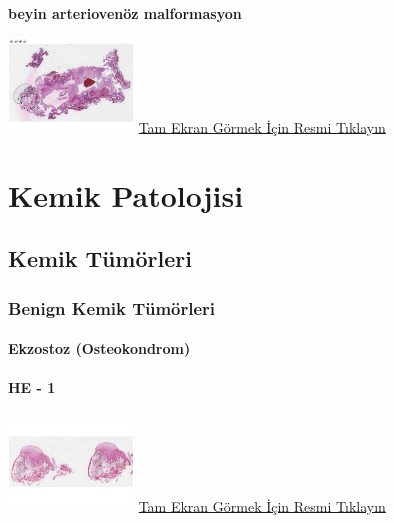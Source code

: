 \documentclass[
  letterpaper,
  DIV=11,
  numbers=noendperiod]{scrreprt}
\begin{document}
\textbf{beyin arteriovenöz malformasyon}

\href{https://images.patolojiatlasi.com/brain-arteriovenous-malformation/HE.html}{\includegraphics[width=0.25\textwidth,height=\textheight]{./screenshots/brain-arteriovenous-malformation_screenshot.png}}
\href{https://images.patolojiatlasi.com/brain-arteriovenous-malformation/HE.html}{Tam
Ekran Görmek İçin Resmi Tıklayın}

\part{Kemik Patolojisi}

\hypertarget{sec-kemik-tumorleri}{%
\chapter{Kemik Tümörleri}\label{sec-kemik-tumorleri}}

\hypertarget{sec-benign-kemik-tumorleri}{%
\section{Benign Kemik Tümörleri}\label{sec-benign-kemik-tumorleri}}

\hypertarget{sec-ekzostoz}{%
\subsection{Ekzostoz (Osteokondrom)}\label{sec-ekzostoz}}

\hypertarget{he---1-4}{%
\subsection{HE - 1}\label{he---1-4}}

\href{https://images.patolojiatlasi.com/exostosis/oc.html}{\includegraphics[width=0.25\textwidth,height=\textheight]{./screenshots/exostosis-1_screenshot.png}}
\href{https://images.patolojiatlasi.com/exostosis/oc.html}{Tam Ekran
Görmek İçin Resmi Tıklayın}
\end{document}

